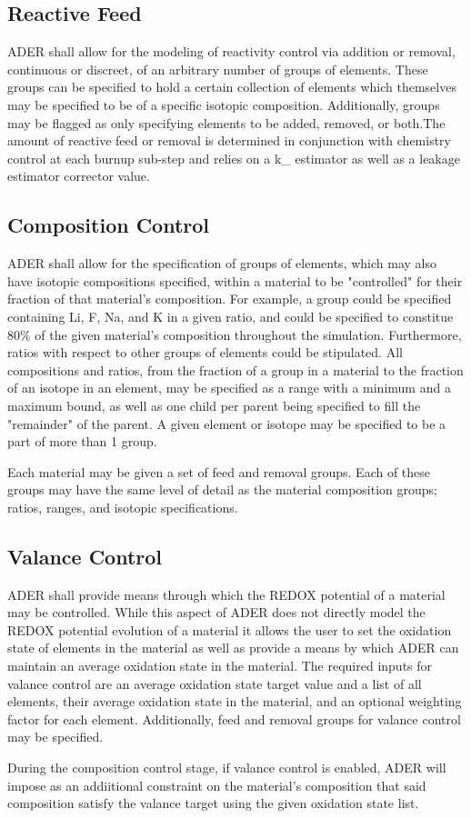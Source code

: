 \documentclass[12pt]{article}
\begin{document}
\subsection{Reactive Feed}
ADER shall allow for the modeling of reactivity control via addition or
removal, continuous or discreet, of an arbitrary number of groups of elements.
These groups can be
specified to hold a certain collection of elements which themselves
may be specified to be of a specific isotopic composition. Additionally,
groups may be flagged as only specifying elements to be added, removed, or both.The amount of reactive feed or removal is determined in conjunction with
chemistry control at each burnup sub-step and relies on a k_{\infty} estimator
as well as a leakage estimator corrector value.
\subsection{Composition Control}
ADER shall allow for the specification of groups of elements, which may also
have isotopic compositions specified, within a material
to be "controlled" for their fraction of that material's composition. For
example, a group could be specified containing Li, F, Na, and K in a given
ratio, and could
be specified to constitue 80\% of the given material's composition
throughout the simulation. Furthermore, ratios with respect to other groups
of elements could be stipulated. 
All compositions and ratios, from the fraction of a
 group in a material to the fraction of an isotope in an element,
may be specified as a range with a minimum
and a maximum bound, as well as one child per parent being specified to fill
the "remainder" of the parent.
A given element or isotope may be specified to be a part
of more than 1 group.\par
Each material may be given a set of feed and removal
groups. Each of these groups may have the same level of detail as the
material composition groups; ratios, ranges, and isotopic specifications.
\subsection{Valance Control}
ADER shall provide means through which the REDOX potential of a material may
be controlled. While this aspect of ADER does not directly model the REDOX
potential evolution of a material it allows the user to set the oxidation
state of elements in the material as well as provide a means by which ADER
can maintain an average oxidation state in the material.
The required inputs for valance control are an average oxidation state
target value and a list of all elements, their average oxidation state
in the material, and an optional weighting factor for each element.
Additionally, feed and removal groups for valance control may be
specified. \par
During the composition control stage, if valance control is enabled,
ADER will impose as an addiitional constraint on the material's composition
that said composition satisfy the valance target using the given oxidation
state list.
\end{document}

